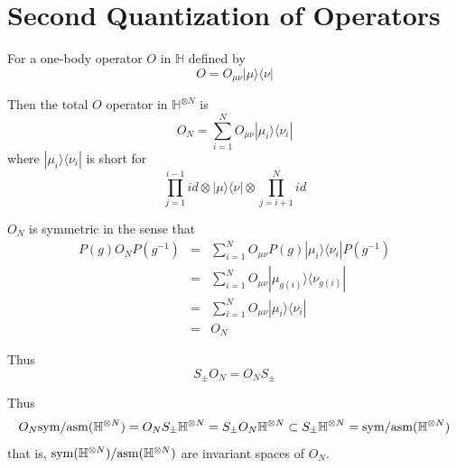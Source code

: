 \documentclass[12pt]{book}
\begin{document}
	\section{Second Quantization of Operators}
	For a one-body operator $O$ in $\mathbb H$ defined by
	\begin{equation}
		O=O_{\mu\nu}|\mu\rangle\langle\nu|
	\end{equation}
	
	Then the total $O$ operator in $\mathbb H^{\otimes N}$ is
	\begin{equation}
		O_N=\sum_{i=1}^NO_{\mu\nu}|\mu_i\rangle\langle\nu_i|
	\end{equation}
	where $|\mu_i\rangle\langle\nu_i|$ is short for
	\begin{equation}
		\prod_{j=1}^{i-1}id\otimes|\mu\rangle\langle\nu|\otimes\prod_{j=i+1}^{N}id
	\end{equation}
	
	$O_N$ is symmetric in the sense that
	\begin{eqnarray}
		P(g)O_NP(g^{-1})&=&\sum_{i=1}^NO_{\mu\nu}P(g)|\mu_i\rangle\langle\nu_i|P(g^{-1})\\
		&=&\sum_{i=1}^NO_{\mu\nu}|\mu_{g(i)}\rangle\langle\nu_{g(i)}|\\
		&=&\sum_{i=1}^NO_{\mu\nu}|\mu_i\rangle\langle\nu_i|\\
		&=&O_N
	\end{eqnarray}
	
	Thus
	\begin{equation}
		S_\pm O_N=O_NS_\pm
	\end{equation}
	
	Thus
	\begin{equation}
		O_N{\rm sym}/{\rm asm}(\mathbb H^{\otimes N})=O_NS_\pm\mathbb H^{\otimes N}=S_\pm O_N\mathbb H^{\otimes N}\subset S_\pm\mathbb H^{\otimes N}={\rm sym}/{\rm asm}(\mathbb H^{\otimes N})
	\end{equation}
	that is, ${\rm sym}(\mathbb H^{\otimes N})/{\rm asm}(\mathbb H^{\otimes N})$ are invariant spaces of $O_N$.
	
\end{document}
